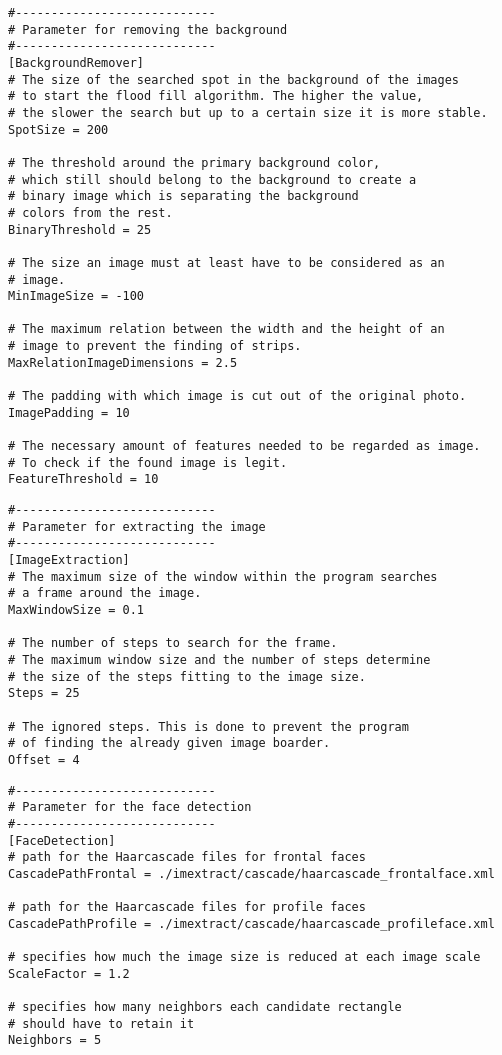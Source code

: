 
\begin{lstlisting}
#----------------------------
# Parameter for removing the background
#----------------------------
[BackgroundRemover]
# The size of the searched spot in the background of the images
# to start the flood fill algorithm. The higher the value, 
# the slower the search but up to a certain size it is more stable.
SpotSize = 200

# The threshold around the primary background color, 
# which still should belong to the background to create a
# binary image which is separating the background 
# colors from the rest.
BinaryThreshold = 25

# The size an image must at least have to be considered as an 
# image.
MinImageSize = -100

# The maximum relation between the width and the height of an 
# image to prevent the finding of strips.
MaxRelationImageDimensions = 2.5

# The padding with which image is cut out of the original photo.
ImagePadding = 10

# The necessary amount of features needed to be regarded as image. 
# To check if the found image is legit.
FeatureThreshold = 10
\end{lstlisting}
\begin{lstlisting}
#----------------------------
# Parameter for extracting the image
#----------------------------
[ImageExtraction]
# The maximum size of the window within the program searches
# a frame around the image.
MaxWindowSize = 0.1

# The number of steps to search for the frame. 
# The maximum window size and the number of steps determine 
# the size of the steps fitting to the image size.
Steps = 25

# The ignored steps. This is done to prevent the program 
# of finding the already given image boarder.
Offset = 4
\end{lstlisting}
\newpage	
\begin{lstlisting}
#----------------------------
# Parameter for the face detection
#----------------------------
[FaceDetection]
# path for the Haarcascade files for frontal faces
CascadePathFrontal = ./imextract/cascade/haarcascade_frontalface.xml

# path for the Haarcascade files for profile faces
CascadePathProfile = ./imextract/cascade/haarcascade_profileface.xml

# specifies how much the image size is reduced at each image scale
ScaleFactor = 1.2

# specifies how many neighbors each candidate rectangle 
# should have to retain it
Neighbors = 5
\end{lstlisting}
